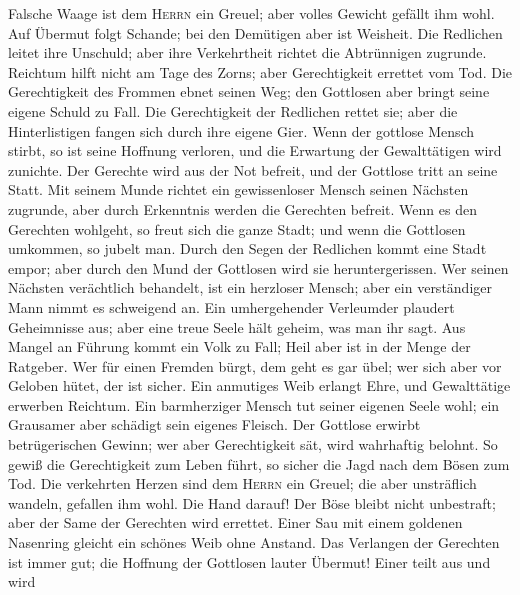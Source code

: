  Falsche Waage ist dem \textsc{Herrn} ein Greuel; aber
volles Gewicht gefällt ihm wohl.  Auf Übermut folgt
Schande; bei den Demütigen aber ist Weisheit.  Die
Redlichen leitet ihre Unschuld; aber ihre Verkehrtheit richtet die
Abtrünnigen zugrunde.  Reichtum hilft nicht am Tage des
Zorns; aber Gerechtigkeit errettet vom Tod.  Die
Gerechtigkeit des Frommen ebnet seinen Weg; den Gottlosen aber bringt
seine eigene Schuld zu Fall.  Die Gerechtigkeit der
Redlichen rettet sie; aber die Hinterlistigen fangen sich durch ihre
eigene Gier.  Wenn der gottlose Mensch stirbt, so ist
seine Hoffnung verloren, und die Erwartung der Gewalttätigen wird
zunichte.  Der Gerechte wird aus der Not befreit, und der
Gottlose tritt an seine Statt.  Mit seinem Munde richtet
ein gewissenloser Mensch seinen Nächsten zugrunde, aber durch Erkenntnis
werden die Gerechten befreit.  Wenn es den Gerechten
wohlgeht, so freut sich die ganze Stadt; und wenn die Gottlosen
umkommen, so jubelt man.  Durch den Segen der Redlichen
kommt eine Stadt empor; aber durch den Mund der Gottlosen wird sie
heruntergerissen.  Wer seinen Nächsten verächtlich
behandelt, ist ein herzloser Mensch; aber ein verständiger Mann nimmt es
schweigend an.  Ein umhergehender Verleumder plaudert
Geheimnisse aus; aber eine treue Seele hält geheim, was man ihr sagt.
 Aus Mangel an Führung kommt ein Volk zu Fall; Heil aber
ist in der Menge der Ratgeber.  Wer für einen Fremden
bürgt, dem geht es gar übel; wer sich aber vor Geloben hütet, der ist
sicher.  Ein anmutiges Weib erlangt Ehre, und
Gewalttätige erwerben Reichtum.  Ein barmherziger Mensch
tut seiner eigenen Seele wohl; ein Grausamer aber schädigt sein eigenes
Fleisch.  Der Gottlose erwirbt betrügerischen Gewinn; wer
aber Gerechtigkeit sät, wird wahrhaftig belohnt.  So
gewiß die Gerechtigkeit zum Leben führt, so sicher die Jagd nach dem
Bösen zum Tod.  Die verkehrten Herzen sind dem
\textsc{Herrn} ein Greuel; die aber unsträflich wandeln, gefallen ihm
wohl.  Die Hand darauf! Der Böse bleibt nicht unbestraft;
aber der Same der Gerechten wird errettet.  Einer Sau mit
einem goldenen Nasenring gleicht ein schönes Weib ohne Anstand.
 Das Verlangen der Gerechten ist immer gut; die Hoffnung
der Gottlosen lauter Übermut!  Einer teilt aus und wird
